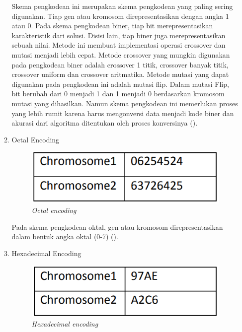 \begin{enumerate}
\begin{enumerate}
    Skema pengkodean ini merupakan skema pengkodean yang paling sering \linebreak digunakan. 
    Tiap gen atau kromosom direpresentasikan dengan angka 1 atau 0. Pada skema pengkodean biner, 
    tiap bit merepresentasikan karakteristik dari solusi. \linebreak Disisi lain, tiap biner juga merepresentasikan sebuah nilai.
    Metode ini membuat implementasi operasi crossover dan mutasi menjadi lebih cepat. 
    Metode crossover yang mungkin digunakan pada pengkodean biner adalah crossover 1 titik, crossover banyak titik, crossover uniform dan crossover aritmatika.
    Metode mutasi yang dapat digunakan pada pengkodean ini adalah mutasi flip.
    Dalam mutasi Flip, bit berubah dari 0 menjadi 1 dan 1 menjadi 0 berdasarkan kromosom mutasi yang dihasilkan.
    Namun skema pengkodean ini memerlukan proses yang lebih rumit karena harus mengonversi data menjadi kode biner dan akurasi dari algoritma ditentukan oleh proses konversinya (\cite{Katoch2020}).
    \item Octal Encoding
      \begin{figure} [ht] \centering
        \includegraphics[scale=0.6]{gambar/octal.png}
        \caption{\emph{Octal encoding}}
        \label{fig:octal}
      \end{figure}

    Pada skema pengkodean oktal, gen atau kromosom direpresentasikan dalam bentuk angka oktal (0-7) (\cite{kumar2013encoding}).
    \item Hexadecimal Encoding
      \begin{figure} [ht] \centering
        \includegraphics[scale=0.6]{gambar/hexa.png}
        \caption{\emph{Hexadecimal encoding}}
        \label{fig:hexa}
      \end{figure}


\end{enumerate}
\end{enumerate}
